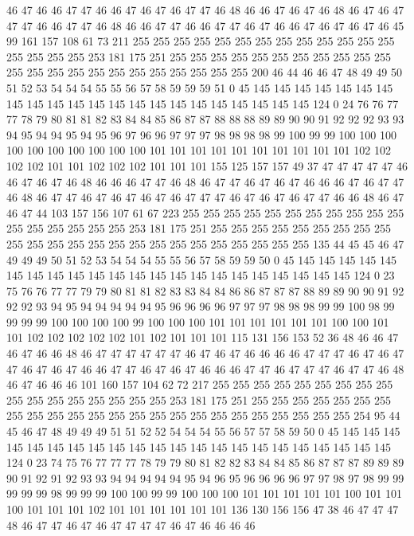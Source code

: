 46 47 46 46 47 47 46 46 47 46 47 46 47 47 46 48 46 46 47 46
47 46 48 46 47 46 47 47 47 46 46 47 47 46 48 46 46 47 47 46
46 47 47 46 47 46 46 47 46 47 46 47 46 45 99 161 157 108 61 73
211 255 255 255 255 255 255 255 255 255 255 255 255 255 255 255 255 255 253 181
175 251 255 255 255 255 255 255 255 255 255 255 255 255 255 255 255 255 255 255
255 255 255 255 255 200 46 44 46 46 47 48 49 49 50 51 52 53 54 54
54 55 55 56 57 58 59 59 59 51 0 45 145 145 145 145 145 145 145 145
145 145 145 145 145 145 145 145 145 145 145 145 145 145 124 0 24 76 76 77
77 78 79 80 81 81 82 83 84 84 85 86 87 87 88 88 88 89 89 90
90 91 92 92 92 93 93 94 95 94 94 95 94 95 96 97 96 96 97 97
97 98 98 98 98 99 100 99 99 100 100 100 100 100 100 100 100 100 100 101
101 101 101 101 101 101 101 101 101 102 102 102 102 101 101 102 102 102 101 101
101 155 125 157 157 49 37 47 47 47 47 47 46 46 47 46 47 46 48 46
46 46 47 47 46 48 46 47 47 46 47 46 47 46 46 46 47 46 47 47
46 48 46 47 47 46 47 46 47 46 47 46 47 47 47 46 47 46 47 46
47 47 46 46 48 46 47 46 47 44 103 157 156 107 61 67 223 255 255 255
255 255 255 255 255 255 255 255 255 255 255 255 255 255 253 181 175 251 255 255
255 255 255 255 255 255 255 255 255 255 255 255 255 255 255 255 255 255 255 255
255 255 135 44 45 45 46 47 49 49 49 50 51 52 53 54 54 54 55 55
56 57 58 59 59 50 0 45 145 145 145 145 145 145 145 145 145 145 145 145
145 145 145 145 145 145 145 145 145 145 124 0 23 75 76 76 77 77 79 79
80 81 81 82 83 83 84 84 86 86 87 87 87 88 89 89 90 90 91 92
92 92 93 94 95 94 94 94 94 94 95 96 96 96 96 97 97 97 98 98
98 99 99 100 98 99 99 99 99 100 100 100 100 99 100 100 100 101 101 101
101 101 101 100 100 101 101 102 102 102 102 102 101 102 101 101 101 115 131 156
153 52 36 48 46 46 47 46 47 46 46 48 46 47 47 47 47 47 47 46
47 46 47 46 46 46 46 47 47 47 46 47 46 47 47 46 47 46 47 46
46 47 47 46 47 46 47 46 46 46 47 47 46 47 47 47 46 47 47 46
48 46 47 46 46 46 101 160 157 104 62 72 217 255 255 255 255 255 255 255
255 255 255 255 255 255 255 255 255 255 253 181 175 251 255 255 255 255 255 255
255 255 255 255 255 255 255 255 255 255 255 255 255 255 255 255 255 255 254 95
44 45 46 47 48 49 49 49 51 51 52 52 54 54 54 55 56 57 57 58
59 50 0 45 145 145 145 145 145 145 145 145 145 145 145 145 145 145 145 145
145 145 145 145 145 145 124 0 23 74 75 76 77 77 77 78 79 79 80 81
82 82 83 84 84 85 86 87 87 87 89 89 89 90 91 92 91 92 93 93
94 94 94 94 94 95 94 96 95 96 96 96 96 97 97 98 97 98 99 99
99 99 99 98 99 99 99 100 100 99 99 100 100 100 101 101 101 101 101 100
101 101 100 101 101 101 102 101 101 101 101 101 101 136 130 156 156 47 38 46
47 47 47 48 46 47 47 46 47 46 47 47 47 47 46 47 46 46 46 46

